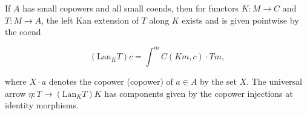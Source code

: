 If $A$ has small copowers and all small coends, then for functors $K: M \to C$ and $T: M \to A$, the left Kan extension of $T$ along $K$ exists and is given pointwise by the coend

$$(\mathrm{Lan}_K T)c = \int^{m} C(Km, c) \cdot Tm,$$

where $X \cdot a$ denotes the copower (copower) of $a \in A$ by the set $X$. The universal arrow $\eta: T \to (\mathrm{Lan}_K T)K$ has components given by the copower injections at identity morphisms.
